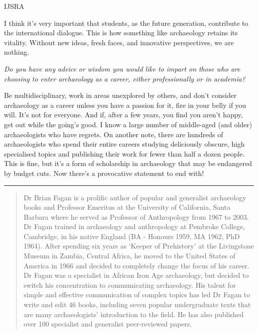 \begin{labeling}{IJSRA}
\item[BMF] I think it’s very important that students, as the future generation, contribute to the international dialogue. This is how something like archaeology retains its vitality. Without new ideas, fresh faces, and innovative perspectives, we are nothing.

\item[IJSRA] \textit{Do you have any advice or wisdom you would like to impart on those who are choosing to enter archaeology as a career, either professionally or in academia?}

\item[BMF]Be multidisciplinary, work in areas unexplored by others, and don’t consider archaeology as a career unless you have a passion for it, fire in your belly if you will. It’s not for everyone. And if, after a few years, you find you aren’t happy, get out while the going’s good. I know a large number of middle-aged (and older) archaeologists who have regrets. On another note, there are hundreds of archaeologists who spend their entire careers studying deliciously obscure, high specialised topics and publishing their work for fewer than half a dozen people. This is fine, but it’s a form of scholarship in archaeology that may be endangered by budget cuts. Now there’s a provocative statement to end with!           

  \end{labeling}
\noindent\rule[0.5ex]{\linewidth}{1pt}

\blockquote{Dr Brian Fagan is a prolific author of popular and generalist archaeology books and Professor Emeritus at the University of California, Santa Barbara where he served as Professor of Anthropology from 1967 to 2003. Dr Fagan trained in archaeology and anthropology at Pembroke College, Cambridge, in his native England (BA - Honours 1959, MA 1962, PhD 1964). After spending six years as ‘Keeper of Prehistory’ at the Livingstone Museum in Zambia, Central Africa, he moved to the United States of America in 1966 and decided to completely change the focus of his career. Dr Fagan was a specialist in African Iron Age archaeology, but decided to switch his concentration to communicating archaeology. His talent for simple and effective communication of complex topics has led Dr Fagan to write and edit 46 books, including seven popular undergraduate texts that are many archaeologists’ introduction to the field. He has also published over 100 specialist and generalist peer-reviewed papers.}



	\label{Pasch:lastpage}
\closingarticle